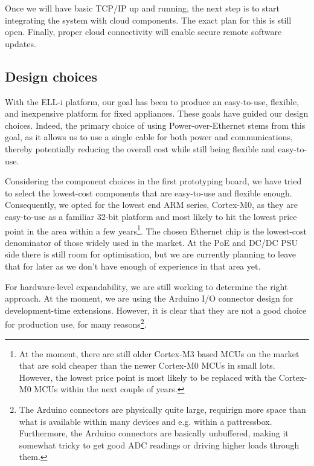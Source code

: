 \documentclass[draft,a4paper]{siamltex}
\begin{document}
Once we will have basic TCP/IP up and running, the next step is to
start integrating the system with cloud components.  The exact plan
for this is still open.  Finally, proper cloud connectivity will
enable secure remote software updates.

\subsection{Design choices}


With the ELL-i platform, our goal has been to produce an easy-to-use,
flexible, and inexpensive platform for fixed appliances.  These goals
have guided our design choices.  Indeed, the primary choice of using
Power-over-Ethernet stems from this goal, as it allows us to use a
single cable for both power and communications, thereby potentially
reducing the overall cost while still being flexible and easy-to-use.

Considering the component choices in the first prototyping board, we
have tried to select the lowest-cost components that are easy-to-use
and flexible enough.  Consequently, we opted for the lowest end ARM
series, Cortex-M0, as they are easy-to-use as a familiar 32-bit
platform and most likely to hit the lowest price point in the area
within a few years\footnote{At the moment, there are still older
  Cortex-M3 based MCUs on the market that are sold cheaper than the
  newer Cortex-M0 MCUs in small lots.  However, the lowest price
  point is most likely to be replaced with the Cortex-M0 MCUs within
  the next couple of years.}.
The chosen Ethernet chip is the lowest-cost denominator of those
widely used in the market.  At the PoE and DC/DC PSU side there is
still room for optimisation, but we are currently planning to leave
that for later as we don't have enough of experience in that area yet.

For hardware-level expandability, we are still working to determine
the right approach.  At the moment, we are using the Arduino I/O
connector design for development-time extensions.  However, it is
clear that they are not a good choice for production use, for many
reasons\footnote{The Arduino connectors are physically quite large,
  requirign more space than what is available within many devices and
  e.g. within a pattressbox.  Furthermore, the Arduino connectors are
  basically unbuffered, making it somewhat tricky to get good ADC
  readings or driving higher loads through them.}.
\end{document}
